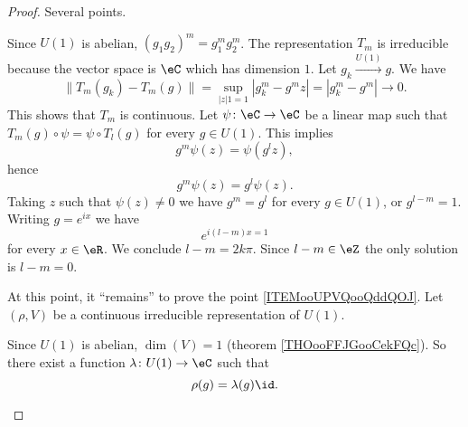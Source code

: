 \begin{proof}
	Several points.
	\begin{subproof}
		\spitem[It is a representation]
		Since \( U(1)\) is abelian, \( (g_1g_2)^m=g_1^mg_2^m\).
		\spitem[Irreducible]
		The representation \( T_m\) is irreducible because the vector space is \( \eC\) which has dimension \( 1\).
		\spitem[Continuous]
		Let \( g_k\stackrel{U(1)}{\longrightarrow}g\). We have
		\begin{equation}
			\| T_m(g_k)-T_m(g) \|=\sup_{| z |1=1}| g_k^m-g^mz |=| g_k^m-g^m |\to 0.
		\end{equation}
		This shows that \( T_m\) is continuous.
		Let \( \psi\colon \eC\to \eC\) be a linear map such that \( T_m(g)\circ\psi=\psi\circ T_l(g)\) for every \( g\in U(1)\). This implies
		\begin{equation}
			g^m\psi(z)=\psi(g^lz),
		\end{equation}
		hence
		\begin{equation}
			g^m\psi(z)=g^l\psi(z).
		\end{equation}
		Taking \( z\) such that \( \psi(z)\neq 0\) we have \( g^m=g^l\) for every \( g\in U(1)\), or \( g^{l-m}=1\). Writing \( g= e^{ix}\) we have
		\begin{equation}
			e^{i(l-m)x=1}
		\end{equation}
		for every \( x\in \eR\). We conclude \( l-m=2k \pi\). Since \( l-m\in \eZ\) the only solution is \( l-m=0\).

	\end{subproof}
	At this point, it ``remains'' to prove the point \ref{ITEMooUPVQooQddQOJ}. Let \( (\rho, V)\) be a continuous irreducible representation of \( U(1)\).

	\begin{subproof}
		Since \( U(1)\) is abelian, \( \dim(V)=1\) (theorem \ref{THOooFFJGooCekFQc}). So there exist a function \( \lambda\colon U(1)\to \eC\) such that
		\begin{equation}
			\rho(g)=\lambda(g)\id.
		\end{equation}

		\spitem[\( \lambda\) is continuous]


\end{subproof}
\end{proof}
